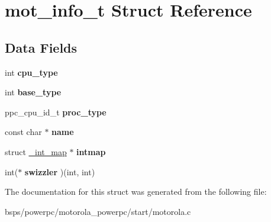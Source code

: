 \hypertarget{structmot__info__t}{}\section{mot\+\_\+info\+\_\+t Struct Reference}
\label{structmot__info__t}
\subsection*{Data Fields}
\begin{DoxyCompactItemize}
\item 
\mbox{\label{structmot__info__t_a89fa560b0ae0a9d2ce76d97436b6e7e2}} 
int {\bfseries cpu\+\_\+type}
\item 
\mbox{\label{structmot__info__t_a94e80d0b6952f8cb1b913298ee2b6704}} 
int {\bfseries base\+\_\+type}
\item 
\mbox{\label{structmot__info__t_a182aa266f641869b16c807e552a4cc16}} 
ppc\+\_\+cpu\+\_\+id\+\_\+t {\bfseries proc\+\_\+type}
\item 
\mbox{\label{structmot__info__t_a8f9df23dd2a9b51b3821c0d7af8960f9}} 
const char $\ast$ {\bfseries name}
\item 
\mbox{\label{structmot__info__t_a6947eb53cee4d93489e921373145f79f}} 
struct \mbox{\hyperlink{struct__int__map}{\+\_\+int\+\_\+map}} $\ast$ {\bfseries intmap}
\item 
\mbox{\label{structmot__info__t_a3e55e4cb3e4658f00b0a7ccffb9e869f}} 
int($\ast$ {\bfseries swizzler} )(int, int)
\end{DoxyCompactItemize}


The documentation for this struct was generated from the following file\+:\begin{DoxyCompactItemize}
\item 
bsps/powerpc/motorola\+\_\+powerpc/start/motorola.\+c\end{DoxyCompactItemize}
